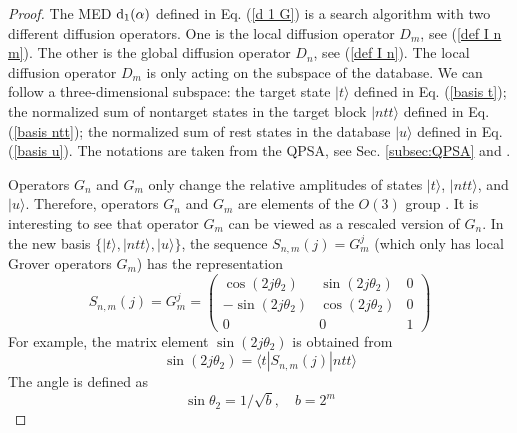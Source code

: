\documentclass[%
 twocolumn,
 10pt,
 superscriptaddress,
 longbibliography,
 amsmath,amssymb,
 aps,
 pra,
floatfix,
]{revtex4-1}
\begin{document}
\begin{proof}
	The MED $\text d_1(\alpha)$ defined in Eq. (\ref{d 1 G}) is a search algorithm with two different diffusion operators. One is the local diffusion operator $D_m$, see (\ref{def I n m}). The other is the global diffusion operator $D_n$, see (\ref{def I n}). The local diffusion operator $D_m$ is only acting on the subspace of the database. We can follow a three-dimensional subspace: the target state $|t\rangle$ defined in Eq. (\ref{basis t}); the normalized sum of nontarget states in the target block $|ntt\rangle$ defined in Eq. (\ref{basis ntt}); the normalized sum of rest states in the database $|u\rangle$ defined in Eq. (\ref{basis u}). The notations are taken from the QPSA, see Sec. \ref{subsec:QPSA} and \cite{Korepin05,KG06}.

	Operators $G_n$ and $G_m$ only change the relative amplitudes of states $|t\rangle$, $|ntt\rangle$, and $|u\rangle$. Therefore, operators $G_n$ and $G_m$ are elements of the $O(3)$ group \cite{KV06}. It is interesting to see that operator $G_m$ can be viewed as a rescaled version of $G_n$. In the new basis $\{|t\rangle,|ntt\rangle,|u\rangle\}$, the sequence $S_{n,m}(j)=G^j_m$ (which only has local Grover operators $G_m$) has the representation
	\begin{equation}
		S_{n,m}(j)=G^j_m=\left(\begin{array}{ccc}
				\cos(2j\theta_2)  & \sin(2j\theta_2) & 0 \\
				-\sin(2j\theta_2) & \cos(2j\theta_2) & 0 \\
				0                 & 0                & 1
			\end{array}
		\right)
	\end{equation}
	For example, the matrix element $\sin(2j\theta_2)$ is obtained from
	\begin{equation}
		\sin(2j\theta_2) = \langle t|S_{n,m}(j)|ntt\rangle
	\end{equation}
	The angle is defined as
	\begin{equation}
		\sin\theta_2 = 1/\sqrt b,\quad b=2^m
	\end{equation}


\end{proof}
\end{document}
